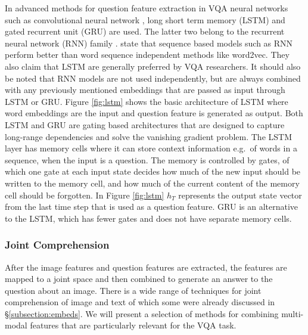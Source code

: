 \documentclass{article}
\begin{document}
In advanced methods for question feature extraction in VQA neural networks such as convolutional neural network \citep{krizhevsky2012imagenet}, long short term memory (LSTM) \citep{lstm} and gated recurrent unit (GRU) \citep{cho2014gru} are used. The latter two belong to the recurrent neural network (RNN) family \citep{elman1990finding}. \citet{young2018recent} state that sequence based models such as RNN perform better than word sequence independent methods like word2vec. They also claim that LSTM are generally preferred by VQA researchers. It should also be noted that RNN models are not used independently, but are always combined with any previously mentioned embeddings that are passed as input through LSTM or GRU. Figure \ref{fig:lstm} shows the basic architecture of LSTM where word embeddings are the input and question feature is generated as output. Both LSTM and GRU are gating based architectures that are designed to capture long-range dependencies and solve the vanishing gradient problem. The LSTM layer has memory cells where it can store context information e.g.\ of words in a sequence, when the input is a question. The memory is controlled by gates, of which one gate at each input state decides how much of the new input should be written to the memory cell, and how much of the current content of the memory cell should be forgotten. In Figure \ref{fig:lstm} $h_T$ represents the output state vector from the last time step that is used as a question feature. GRU is an alternative to the LSTM, which has fewer gates and does not have separate memory cells.

\subsubsection{Joint Comprehension} \label{subsubsection:attention}

After the image features and question features are extracted, the features are mapped to a joint space and then combined to generate an answer to the question about an image. There is a wide range of techniques for joint comprehension of image and text of which some were already discussed in \S \ref{subsection:embeds}. We will present a selection of methods for combining multi-modal features that are particularly relevant for the VQA task.
\end{document}
